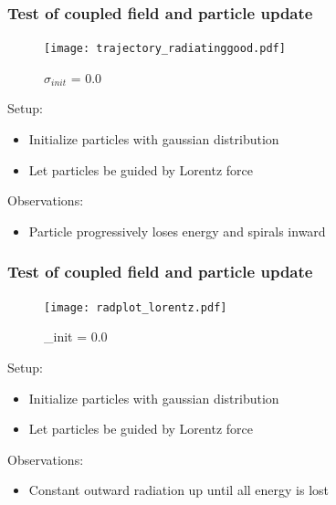 \documentclass[5pt]{beamer}
\begin{document}
\begin{frame}
  \frametitle{Test of coupled field and particle update}
  \begin{minipage}{0.45\textwidth}
    \begin{figure}[h]
      \centering
      \texttt{[image: trajectory\_radiatinggood.pdf]}
      \caption{$\sigma_{init}$ = 0.0}
      \label{fig:smallvar}
    \end{figure}
  \end{minipage}
  \hfill
  \begin{minipage}{0.5\textwidth}
  
  Setup:
  \begin{itemize}
    \item[\cdot] Initialize particles with gaussian distribution
    \item[\cdot] Let particles be guided by Lorentz force
  \end{itemize} 
  Observations:
  \begin{itemize}
    \item[\cdot] Particle progressively loses energy and spirals inward
  \end{itemize}
\end{minipage}


\end{frame}


\begin{frame}
  \frametitle{Test of coupled field and particle update}
  \begin{minipage}{0.45\textwidth}
    \begin{figure}[h]
      \centering
      \texttt{[image: radplot\_lorentz.pdf]}
      \caption{\sigma_{init} = 0.0}
      \label{fig:smallvar}
    \end{figure}
  \end{minipage}
  \hfill
  \begin{minipage}{0.5\textwidth}
  
  Setup:
  \begin{itemize}
    \item[\cdot] Initialize particles with gaussian distribution
    \item[\cdot] Let particles be guided by Lorentz force
  \end{itemize} 
  Observations:
  \begin{itemize}
    \item[\cdot] Constant outward radiation up until all energy is lost
  \end{itemize}
\end{minipage}
\end{frame}
\end{document}
